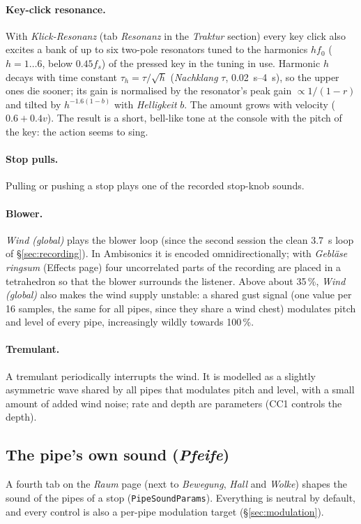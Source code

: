 \documentclass[11pt,a4paper,parskip=half,DIV=11,toc=bibliography]{scrartcl}
\newcommand{\ui}[1]{\emph{#1}}                 %
\newcommand{\fn}[1]{\mbox{\texttt{#1}}}
\begin{document}
\paragraph{Key-click resonance.} With \ui{Klick-Resonanz} (tab \ui{Resonanz} in the \ui{Traktur} section) every key
click also excites a bank of up to six two-pole resonators tuned to the harmonics $hf_0$ ($h=1\dots6$, below
$0.45f_s$) of the pressed key in the tuning in use. Harmonic $h$ decays with time constant
$\tau_h=\tau/\sqrt h$ (\ui{Nachklang} $\tau$, \SIrange{0.02}{4}{s}), so the upper ones die sooner; its gain is
normalised by the resonator's peak gain $\propto 1/(1-r)$ and tilted by $h^{-1.6(1-b)}$ with \ui{Helligkeit} $b$.
The amount grows with velocity ($0.6+0.4v$). The result is a short, bell-like tone at the console with the
pitch of the key: the action seems to sing.

\paragraph{Stop pulls.} Pulling or pushing a stop plays one of the recorded stop-knob sounds.

\paragraph{Blower.} \ui{Wind (global)} plays the blower loop (since the second session the clean \SI{3.7}{s} loop of
\S\ref{sec:recording}). In Ambisonics it is encoded
omnidirectionally; with \ui{Gebläse ringsum} (Effects page) four uncorrelated parts of the recording are
placed in a tetrahedron so that the blower surrounds the listener. Above about 35\,\%, \ui{Wind
(global)} also makes the wind supply unstable: a shared gust signal (one value per 16 samples, the same
for all pipes, since they share a wind chest) modulates pitch and level of every pipe, increasingly
wildly towards 100\,\%.

\paragraph{Tremulant.} A tremulant periodically interrupts the wind. It is modelled as a slightly
asymmetric wave shared by all pipes that modulates pitch and level, with a small amount of added wind
noise; rate and depth are parameters (CC1 controls the depth).

\subsection{The pipe's own sound (\ui{Pfeife})}
\label{sec:pipesound}
A fourth tab on the \ui{Raum} page (next to \ui{Bewegung}, \ui{Hall} and \ui{Wolke}) shapes the sound of the pipes of a
stop (\fn{PipeSoundParams}). Everything is neutral by default, and every control is also a per-pipe modulation target
(\S\ref{sec:modulation}).
\end{document}
